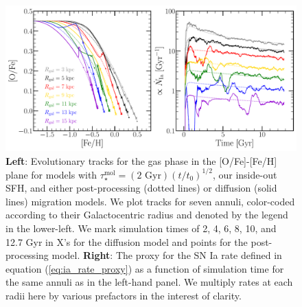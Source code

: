 \documentclass[a4paper, fleqn, usenatbib, useAMS]{mnras}
\newcommand{\refp}[1]{(\ref{#1})}
\begin{document}
\begin{figure} 
\centering 
\includegraphics[scale = 0.42]{tracks_2Gyr_timedep.pdf} 
\caption{\textbf{Left}: Evolutionary tracks for the gas phase in the 
[O/Fe]-[Fe/H] plane for models with 
$\tau_\star^\text{mol} = (\text{2 Gyr})(t/t_0)^{1/2}$, our inside-out SFH, and 
either post-processing (dotted lines) or diffusion (solid lines) migration 
models. We plot tracks for seven annuli, color-coded according to their 
Galactocentric radius and denoted by the legend in the lower-left. We mark 
simulation times of 2, 4, 6, 8, 10, and 12.7 Gyr in X's for the diffusion 
model and points for the post-processing model. 
\textbf{Right}: The proxy for the SN Ia rate defined in equation 
\refp{eq:ia_rate_proxy} as a function of simulation time for the same annuli 
as in the left-hand panel. We multiply rates at each radii here by various 
prefactors in the interest of clarity. }
\label{fig:tracks} 
\end{figure} 
\end{document}
